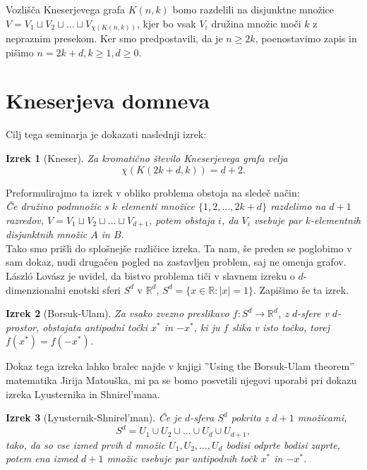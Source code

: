 \documentclass[a4paper,12pt]{article}
\newtheorem{izrek}{Izrek}
\begin{document}
Vozlišča Kneserjevega grafa $K(n,k)$ bomo razdelili na disjunktne množice $V = V_1 \sqcup V_2 \sqcup \ldots \sqcup V_{\chi(K(n,k))}$, kjer bo vsak $V_i$ družina množic moči $k$ z nepraznim presekom. Ker smo predpostavili, da je $n \geq 2k$, poenostavimo zapis in pišimo $n = 2k + d, k \geq 1, d \geq 0$.

\section{Kneserjeva domneva}

Cilj tega seminarja je dokazati naslednji izrek: \\

\begin{izrek}[Kneser]
Za kromatično število Kneserjevega grafa velja
$$\chi(K(2k+d,k)) = d+2.$$
\end{izrek}

\noindent
Preformulirajmo ta izrek v obliko problema obstoja na sledeč način: \\

\noindent
{\em Če družino podmnožic s $k$ elementi množice $\{1, 2, \ldots, 2k+d\}$ razdelimo na $d+1$ razredov,  $V = V_1 \sqcup V_2 \sqcup \ldots \sqcup V_{d+1}$, potem obstaja $i$, da $V_i$ vsebuje par $k$-elementnih disjunktnih množic $A$ in $B$.} \\

Tako smo prišli do splošnejše različice izreka. Ta nam, še preden se poglobimo v sam dokaz, nudi drugačen pogled na zastavljen problem, saj ne omenja grafov. László Lovász je uvidel, da bistvo problema tiči v slavnem izreku o $d$-dimenzionalni enotski sferi $S^d$ v $\mathbb{R}^d $, $S^d = \{x \in \mathbb{R}: |x|=1\}$. Zapišimo še ta izrek.

\begin{izrek}[Borsuk-Ulam]
Za vsako zvezno preslikavo $f:S^d \rightarrow \mathbb{R}^d$, z $d$-sfere v $d$-prostor, obstajata antipodni točki $x^*$ in $-x^*$, ki ju $f$ slika v isto točko, torej $f(x^*)=f(-x^*)$.
\end{izrek}

Dokaz tega izreka lahko bralec najde v knjigi ''Using the Borsuk-Ulam theorem'' matematika Jirija Matouška, mi pa se bomo posvetili njegovi uporabi pri dokazu izreka Lyusternika in Shnirel'mana.

\begin{izrek}[Lyusternik-Shnirel'man]
Če je $d$-sfera $S^d$ pokrita z $d+1$ množicami,
$$S^d = U_1 \cup U_2 \cup \ldots \cup U_d \cup U_{d+1},$$
tako, da so vse izmed prvih $d$ množic $U_1, U_2, \ldots, U_d$ bodisi odprte bodisi zaprte, potem ena izmed $d+1$ množic vsebuje par antipodnih točk $x^*$ in $-x^*$.
\end{izrek}
\end{document}
